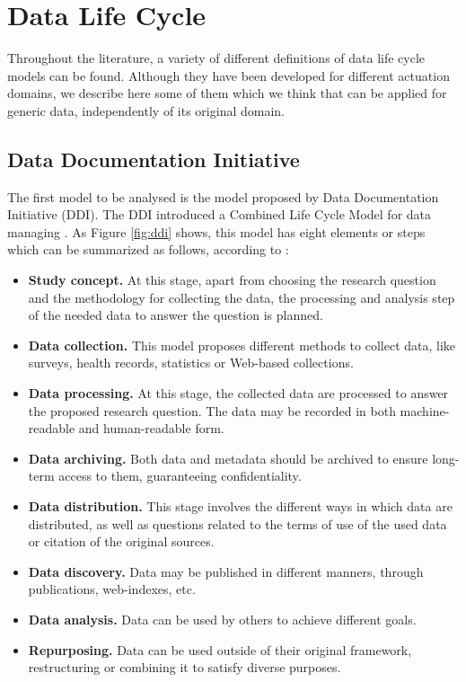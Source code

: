 \section{Data Life Cycle}

Throughout the literature, a variety of different definitions of data life cycle models can be found. Although they have been developed for different actuation domains, we describe here some of them which we think that can be applied for generic data, independently of its original domain.

\subsection{Data Documentation Initiative}

The first model to be analysed is the model proposed by Data Documentation Initiative (DDI). The DDI introduced a Combined Life Cycle Model for data managing \cite{data_documentation_initiative_overview_2008}. As Figure \ref{fig:ddi} shows, this model has eight elements or steps which can be summarized as follows, according to \cite{ball_review_2012}:

\begin{itemize}
    \item \textbf{Study concept.} At this stage, apart from choosing the research question and the methodology for collecting the data, the processing and analysis step of the needed data to answer the question is planned.
    \item \textbf{Data collection.} This model proposes different methods to collect data, like surveys, health records, statistics or Web-based collections.
    \item \textbf{Data processing.} At this stage, the collected data are processed to answer the proposed research question. The data may be recorded in both machine-readable and human-readable form.
    \item \textbf{Data archiving.} Both data and metadata should be archived to ensure long-term access to them, guaranteeing confidentiality.
    \item \textbf{Data distribution.} This stage involves the different ways in which data are distributed, as well as questions related to the terms of use of the used data or citation of the original sources. 
    \item \textbf{Data discovery.} Data may be published in different manners, through publications, web-indexes, etc.
    \item \textbf{Data analysis.} Data can be used by others to achieve different goals.
    \item \textbf{Repurposing.} Data can be used outside of their original framework, restructuring or combining it to satisfy diverse purposes.
\end{itemize}

